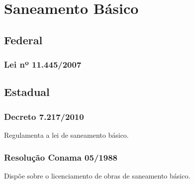 \section{Saneamento Básico}

\begin{subapend}
	\subsection{Federal}
	\begin{subsubapend}
		\item \subsubsection{Lei nº 11.445/2007}
	\end{subsubapend}
\end{subapend}

\begin{subapend}
	\subsection{Estadual}
	\begin{subsubapend}
		\item \subsubsection{Decreto 7.217/2010}
		Regulamenta a lei de saneamento básico.
		\subsubsection{Resolução Conama 05/1988}
		Dispõe sobre o licenciamento de obras de saneamento básico.
	\end{subsubapend}
\end{subapend}
